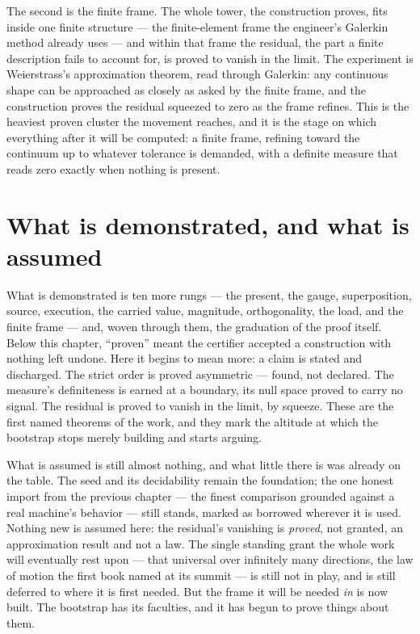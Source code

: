 The second is the finite frame. The whole tower, the construction proves, fits inside one finite
structure --- the finite-element frame the engineer's Galerkin method already uses --- and within that
frame the residual, the part a finite description fails to account for, is proved to vanish in the limit.
The experiment is Weierstrass's approximation theorem, read through Galerkin: any continuous shape can be
approached as closely as asked by the finite frame, and the construction proves the residual squeezed to
zero as the frame refines. This is the heaviest proven cluster the movement reaches, and it is the stage on
which everything after it will be computed: a finite frame, refining toward the continuum up to whatever
tolerance is demanded, with a definite measure that reads zero exactly when nothing is present.

\section{What is demonstrated, and what is assumed}
\label{se:demonstrated-assumed-I3}

What is demonstrated is ten more rungs --- the present, the gauge, superposition, source, execution, the
carried value, magnitude, orthogonality, the load, and the finite frame --- and, woven through them, the
graduation of the proof itself. Below this chapter, ``proven'' meant the certifier accepted a construction
with nothing left undone. Here it begins to mean more: a claim is stated and discharged. The strict order
is proved asymmetric --- found, not declared. The measure's definiteness is earned at a boundary, its null
space proved to carry no signal. The residual is proved to vanish in the limit, by squeeze. These are the
first named theorems of the work, and they mark the altitude at which the bootstrap stops merely building
and starts arguing.

What is assumed is still almost nothing, and what little there is was already on the table. The seed and
its decidability remain the foundation; the one honest import from the previous chapter --- the finest
comparison grounded against a real machine's behavior --- still stands, marked as borrowed wherever it is
used. Nothing new is assumed here: the residual's vanishing is \emph{proved}, not granted, an approximation
result and not a law. The single standing grant the whole work will eventually rest upon --- that universal
over infinitely many directions, the law of motion the first book named at its summit --- is still not in
play, and is still deferred to where it is first needed. But the frame it will be needed \emph{in} is now
built. The bootstrap has its faculties, and it has begun to prove things about them.

